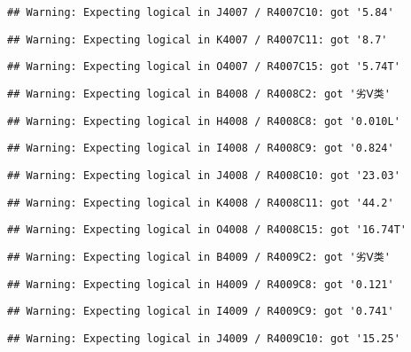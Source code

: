 \documentclass[
]{article}
\begin{document}
\begin{verbatim}
## Warning: Expecting logical in J4007 / R4007C10: got '5.84'
\end{verbatim}

\begin{verbatim}
## Warning: Expecting logical in K4007 / R4007C11: got '8.7'
\end{verbatim}

\begin{verbatim}
## Warning: Expecting logical in O4007 / R4007C15: got '5.74T'
\end{verbatim}

\begin{verbatim}
## Warning: Expecting logical in B4008 / R4008C2: got '劣Ⅴ类'
\end{verbatim}

\begin{verbatim}
## Warning: Expecting logical in H4008 / R4008C8: got '0.010L'
\end{verbatim}

\begin{verbatim}
## Warning: Expecting logical in I4008 / R4008C9: got '0.824'
\end{verbatim}

\begin{verbatim}
## Warning: Expecting logical in J4008 / R4008C10: got '23.03'
\end{verbatim}

\begin{verbatim}
## Warning: Expecting logical in K4008 / R4008C11: got '44.2'
\end{verbatim}

\begin{verbatim}
## Warning: Expecting logical in O4008 / R4008C15: got '16.74T'
\end{verbatim}

\begin{verbatim}
## Warning: Expecting logical in B4009 / R4009C2: got '劣Ⅴ类'
\end{verbatim}

\begin{verbatim}
## Warning: Expecting logical in H4009 / R4009C8: got '0.121'
\end{verbatim}

\begin{verbatim}
## Warning: Expecting logical in I4009 / R4009C9: got '0.741'
\end{verbatim}

\begin{verbatim}
## Warning: Expecting logical in J4009 / R4009C10: got '15.25'
\end{verbatim}
\end{document}
